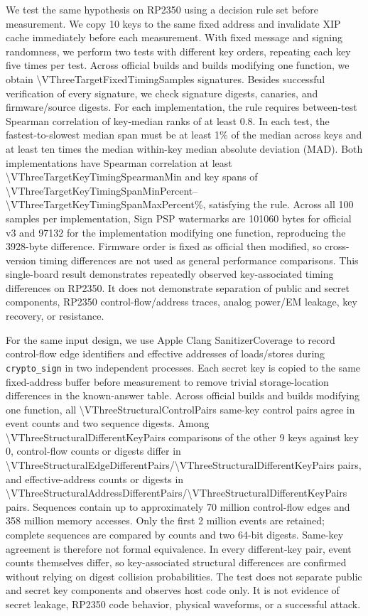 \documentclass[a4paper,10pt]{article}
\theoremstyle{definition}
\theoremstyle{remark}
\begin{document}
We test the same hypothesis on RP2350 using a decision rule set before measurement. We copy 10 keys to the same fixed address and invalidate XIP cache immediately before each measurement. With fixed message and signing randomness, we perform two tests with different key orders, repeating each key five times per test. Across official builds and builds modifying one function, we obtain \num{\VThreeTargetFixedTimingSamples} signatures. Besides successful verification of every signature, we check signature digests, canaries, and firmware/source digests. For each implementation, the rule requires between-test Spearman correlation of key-median ranks of at least 0.8. In each test, the fastest-to-slowest median span must be at least 1\% of the median across keys and at least ten times the median within-key median absolute deviation (MAD). Both implementations have Spearman correlation at least \num{\VThreeTargetKeyTimingSpearmanMin} and key spans of \num{\VThreeTargetKeyTimingSpanMinPercent}--\num{\VThreeTargetKeyTimingSpanMaxPercent}\%, satisfying the rule. Across all 100 samples per implementation, Sign PSP watermarks are \num{101060} bytes for official v3 and \num{97132} for the implementation modifying one function, reproducing the \num{3928}-byte difference. Firmware order is fixed as official then modified, so cross-version timing differences are not used as general performance comparisons. This single-board result demonstrates repeatedly observed key-associated timing differences on RP2350. It does not demonstrate separation of public and secret components, RP2350 control-flow/address traces, analog power/EM leakage, key recovery, or resistance.

For the same input design, we use Apple Clang SanitizerCoverage to record control-flow edge identifiers and effective addresses of loads/stores during \texttt{crypto\_sign} in two independent processes. Each secret key is copied to the same fixed-address buffer before measurement to remove trivial storage-location differences in the known-answer table. Across official builds and builds modifying one function, all \num{\VThreeStructuralControlPairs} same-key control pairs agree in event counts and two sequence digests. Among \num{\VThreeStructuralDifferentKeyPairs} comparisons of the other 9 keys against key 0, control-flow counts or digests differ in \num{\VThreeStructuralEdgeDifferentPairs}/\num{\VThreeStructuralDifferentKeyPairs} pairs, and effective-address counts or digests in \num{\VThreeStructuralAddressDifferentPairs}/\num{\VThreeStructuralDifferentKeyPairs} pairs. Sequences contain up to approximately 70 million control-flow edges and 358 million memory accesses. Only the first 2 million events are retained; complete sequences are compared by counts and two 64-bit digests. Same-key agreement is therefore not formal equivalence. In every different-key pair, event counts themselves differ, so key-associated structural differences are confirmed without relying on digest collision probabilities. The test does not separate public and secret key components and observes host code only. It is not evidence of secret leakage, RP2350 code behavior, physical waveforms, or a successful attack.
\end{document}
